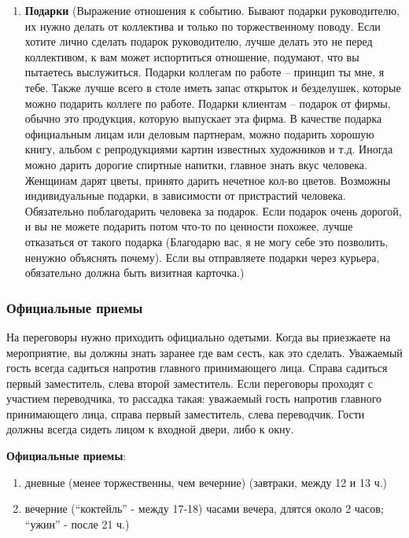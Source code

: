 \documentclass{article}
\begin{document}
\begin{enumerate}
    \item \textbf{Подарки} (Выражение отношения к событию. Бывают подарки руководителю, их нужно делать от коллектива и только по торжественному поводу. Если хотите лично сделать подарок руководителю, лучше делать это не перед коллективом, к вам может испортиться отношение, подумают, что вы пытаетесь выслужиться. Подарки коллегам по работе – принцип ты мне, я тебе. Также лучше всего в столе иметь запас открыток и безделушек, которые можно подарить коллеге по работе. Подарки клиентам – подарок от фирмы, обычно это продукция, которую выпускает эта фирма. В качестве подарка официальным лицам или деловым партнерам, можно подарить хорошую книгу, альбом с репродукциями картин известных художников и т.д. Иногда можно дарить дорогие спиртные напитки, главное знать вкус человека. Женщинам дарят цветы, принято дарить нечетное кол-во цветов. Возможны индивидуальные подарки, в зависимости от пристрастий человека. Обязательно поблагодарить человека за подарок. Если подарок очень дорогой, и вы не можете подарить потом что-то по ценности похожее, лучше отказаться от такого подарка (Благодарю вас, я не могу себе это позволить, ненужно объяснять почему). Если вы отправляете подарки через курьера, обязательно должна быть визитная карточка.)
\end{enumerate}

\subsubsection{Официальные приемы}

На переговоры нужно приходить официально одетыми. Когда вы приезжаете на мероприятие, вы должны знать заранее где вам сесть, как это сделать. Уважаемый гость всегда садиться напротив главного принимающего лица. Справа садиться первый заместитель, слева второй заместитель. Если переговоры проходят с участием переводчика, то рассадка такая: уважаемый гость напротив главного принимающего лица, справа первый заместитель, слева переводчик. Гости должны всегда сидеть лицом к входной двери, либо к окну.

\textbf{Официальные приемы}:

\begin{enumerate}
    \item дневные (менее торжественны, чем вечерние) (завтраки, между 12 и 13 ч.)
    \item вечерние (“коктейль” - между 17-18) часами вечера, длятся около 2 часов; “ужин” - после 21 ч.)
\end{enumerate}
\end{document}
